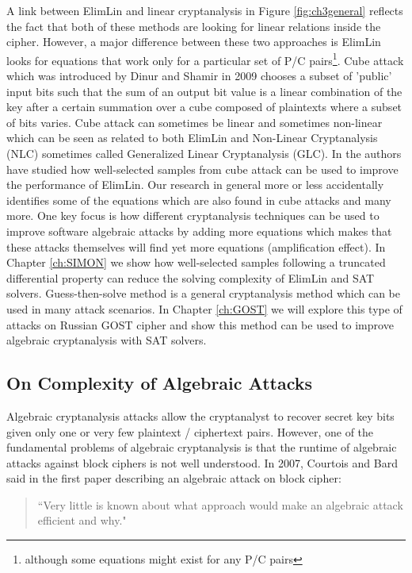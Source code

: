 A link between ElimLin and linear cryptanalysis in Figure \ref{fig:ch3general} reflects the fact that both of these methods are looking for linear relations inside the cipher. However, a major difference between these two approaches is ElimLin looks for equations that work only for a particular set of P/C pairs\footnote{although some equations might exist for any P/C pairs}. Cube attack which was introduced by Dinur and Shamir in 2009 \cite{dinur2009cube} chooses a subset of 'public' input bits such that the sum of an output bit value is a linear combination of the key after a certain summation over a cube composed of plaintexts where a subset of bits varies. Cube attack can sometimes be linear and sometimes non-linear which can be seen as related to both ElimLin and Non-Linear Cryptanalysis (NLC) sometimes called Generalized Linear Cryptanalysis (GLC). In \cite{suvsil2016selection} the authors have studied how well-selected samples from cube attack can be used to improve the performance of ElimLin. Our research in general more or less accidentally identifies some of the equations which are also found in cube attacks and many more. One key focus is how different cryptanalysis techniques can be used to improve software algebraic attacks by adding more equations which makes that these attacks themselves will find yet more equations (amplification effect). 
In Chapter \ref{ch:SIMON} we show how well-selected samples following a truncated differential property can reduce the solving complexity of ElimLin and SAT solvers. Guess-then-solve method is a general cryptanalysis method which can be used in many attack scenarios. In Chapter \ref{ch:GOST} we will explore this type of attacks on Russian GOST cipher and show this method can be used to improve algebraic cryptanalysis with SAT solvers.
%

\subsection{On Complexity of Algebraic Attacks} \label{sec:ACCxty}

Algebraic cryptanalysis attacks allow the cryptanalyst to recover secret key bits given only one or very few plaintext / ciphertext pairs. However, one of the fundamental problems of algebraic cryptanalysis is that the runtime of algebraic attacks against block ciphers is not well understood. In 2007, Courtois and Bard said in the first paper describing an algebraic attack on block cipher:
 
 \begin{quotation}
 	``Very little is known about what approach would make an algebraic attack efficient and why." 
 \end{quotation}


